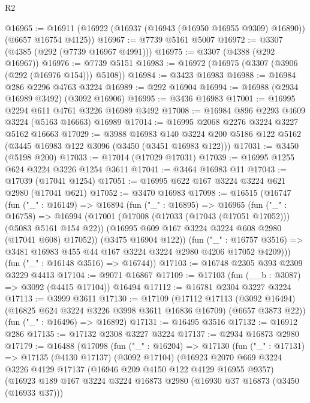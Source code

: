 \begin{lexlean}{R2}
\begin{coremodule}
@16965 := @16911 (@16922 (@16937 (@16943 (@16950 @16955 @9309) @16890)) (@6657 @16754 @4125))
@16967 := @7739 @5161 @5007
@16972 := @3307 (@4385 (@292 (@7739 @16967 @4991)))
@16975 := @3307 (@4388 (@292 @16967))
@16976 := @7739 @5151
@16983 := @16972 (@16975 (@3307 (@3906 (@292 (@16976 @154))) @5108))
@16984 := @3423 @16983
@16988 := @16984 @286 @2296 @4763 @3224
@16989 := @292 @16904
@16994 := @16988 (@2934 @16989 @3492) (@3092 @16906)
@16995 := @3436 @16983
@17001 := @16995 @2294 @611 @4761 @3226 @16989 @3492
@17008 := @16984 @896 @2293 @4609 @3224 (@5163 @16663) @16989
@17014 := @16995 @2068 @2276 @3224 @3227 @5162 @16663
@17029 := @3988
    @16983
    @140
    @3224
    @200
    @5186
    @122
    @5162
    (@3445 @16983 @122 @3096 (@3450 (@3451 @16983 @122)))
@17031 := @3450 (@5198 @200)
@17033 := @17014 (@17029 @17031)
@17039 := @16995 @1255 @624 @3224 @3226 @1254 @3611
@17041 := @3464 @16983 @11
@17043 := @17039 (@17041 @1254)
@17051 := @16995 @622 @167 @3224 @3224 @621 @2980 (@17041 @621)
@17052 := @3470 @16983
@17098 := @16515
    (@16747
      (fun ("_" : @16149) =>
      @16894
        (fun ("_" : @16895) =>
        @16965
          (fun ("_" : @16758) =>
          @16994
            (@17001
              (@17008 (@17033 (@17043 (@17051 @17052))) (@5083 @5161 @154 @22))
              (@16995 @609 @167 @3224 @3224 @608 @2980 (@17041 @608) @17052))
            (@3475 @16904 @122))
          (fun ("_" : @16757 @3516) =>
          @3481 @16983 @455 @44 @167 @3224 @3224 @2980 @4206 @17052 @4209)))
      (fun ("_" : @16148 @3516) => @16744))
@17103 := @16748 @2305 @393 @2309 @3229 @4413
@17104 := @9071 @16867
@17109 := @17103 (fun (__b : @3087) => @3092 (@4415 @17104)) @16494
@17112 := @16781 @2304 @3227 @3224
@17113 := @3999 @3611
@17130 := @17109
    (@17112
      @17113
      (@3092 @16494)
      (@16825 @624 @3224 @3226 @3998 @3611 @16836 @16709)
      (@6657 @3873 @22))
    (fun ("_" : @16496) => @16892)
@17131 := @16495 @3516
@17132 := @16912 @286
@17135 := @17132 @2308 @3227 @3224
@17137 := @2934 @16873 @2980
@17179 := @16488
    (@17098
      (fun ("_" : @16204) =>
      @17130
        (fun ("_" : @17131) =>
        @17135
          (@4130 @17137)
          (@3092 @17104)
          (@16923
            @2070
            @669
            @3224
            @3226
            @4129
            @17137
            (@16946 @209 @4150 @122 @4129 @16955 @9357)
            (@16923
              @189
              @167
              @3224
              @3224
              @16873
              @2980
              (@16930 @37 @16873 (@3450 (@16933 @37)))

\end{coremodule}
\end{lexlean}
